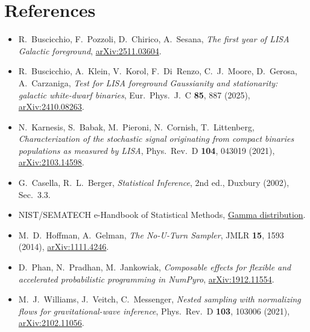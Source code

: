 \documentclass[11pt,a4paper]{article}
\begin{document}
\section*{References}
\begin{itemize}\sloppy
  \item R.~Buscicchio, F.~Pozzoli, D.~Chirico, A.~Sesana, \emph{The first year of LISA
        Galactic foreground},
        \href{https://arxiv.org/abs/2511.03604}{arXiv:2511.03604}.
  \item R.~Buscicchio, A.~Klein, V.~Korol, F.~Di~Renzo, C.~J.~Moore, D.~Gerosa,
        A.~Carzaniga, \emph{Test for LISA foreground Gaussianity and stationarity:
        galactic white-dwarf binaries}, Eur.\ Phys.\ J.\ C \textbf{85}, 887 (2025),
        \href{https://arxiv.org/abs/2410.08263}{arXiv:2410.08263}.
  \item N.~Karnesis, S.~Babak, M.~Pieroni, N.~Cornish, T.~Littenberg,
        \emph{Characterization of the stochastic signal originating from compact
        binaries populations as measured by LISA}, Phys.\ Rev.\ D \textbf{104},
        043019 (2021), \href{https://arxiv.org/abs/2103.14598}{arXiv:2103.14598}.
  \item G.~Casella, R.~L.~Berger, \emph{Statistical Inference}, 2nd ed., Duxbury (2002),
        Sec.~3.3.
  \item NIST/SEMATECH e-Handbook of Statistical Methods,
        \href{https://www.itl.nist.gov/div898/handbook/eda/section3/eda366b.htm}{Gamma distribution}.
  \item M.~D.~Hoffman, A.~Gelman, \emph{The No-U-Turn Sampler}, JMLR \textbf{15}, 1593
        (2014), \href{https://arxiv.org/abs/1111.4246}{arXiv:1111.4246}.
  \item D.~Phan, N.~Pradhan, M.~Jankowiak, \emph{Composable effects for flexible and
        accelerated probabilistic programming in NumPyro},
        \href{https://arxiv.org/abs/1912.11554}{arXiv:1912.11554}.
  \item M.~J.~Williams, J.~Veitch, C.~Messenger, \emph{Nested sampling with normalizing
        flows for gravitational-wave inference}, Phys.\ Rev.\ D \textbf{103}, 103006
        (2021), \href{https://arxiv.org/abs/2102.11056}{arXiv:2102.11056}.
\end{itemize}
\end{document}
